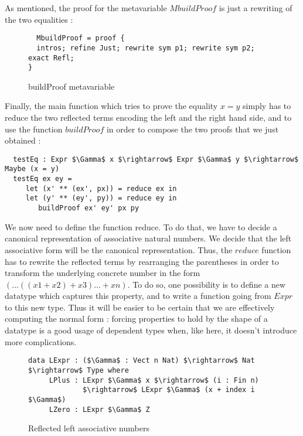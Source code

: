 As mentioned, the proof for the metavariable $MbuildProof$ is just a rewriting of the two equalities :

\begin{figure}[H]
\figrule
\begin{center}
\begin{lstlisting}
  MbuildProof = proof {
  intros; refine Just; rewrite sym p1; rewrite sym p2; exact Refl;
}  
\end{lstlisting}
\end{center}
\caption{buildProof metavariable}
\label{MbuildProof}
\figrule
\end{figure}

Finally, the main function which tries to prove the equality $x=y$ simply has to reduce the two reflected terms encoding the left and the right hand side, and to use the function $buildProof$ in order to compose the two proofs that we just obtained :


\begin{lstlisting}
  testEq : Expr $\Gamma$ x $\rightarrow$ Expr $\Gamma$ y $\rightarrow$ Maybe (x = y)
  testEq ex ey = 
     let (x' ** (ex', px)) = reduce ex in 
     let (y' ** (ey', py)) = reduce ey in
        buildProof ex' ey' px py 
\end{lstlisting}


We now need to define the function reduce. To do that, we have to decide a canonical representation of associative natural numbers. We decide that the left associative form will be the canonical representation. Thus, the $reduce$ function has to rewrite the reflected terms by rearranging the parentheses in order to transform the underlying concrete number in the form $(...((x1 + x2) + x3) ... + xn)$. To do so, one possibility is to define a new datatype which captures this property, and to write a function going from $Expr$ to this new type. Thus it will be easier to be certain that we are effectively computing the normal form : forcing properties to hold by the shape of a datatype is a good usage of dependent types when, like here, it doesn't introduce more complications.

\begin{figure}[H]
\figrule
\begin{center}
\begin{lstlisting}
data LExpr : ($\Gamma$ : Vect n Nat) $\rightarrow$ Nat $\rightarrow$ Type where
     LPlus : LExpr $\Gamma$ x $\rightarrow$ (i : Fin n) 
             $\rightarrow$ LExpr $\Gamma$ (x + index i $\Gamma$)
     LZero : LExpr $\Gamma$ Z
\end{lstlisting}
\end{center}
\caption{Reflected left associative numbers}
\label{LExpr}
\figrule
\end{figure}

